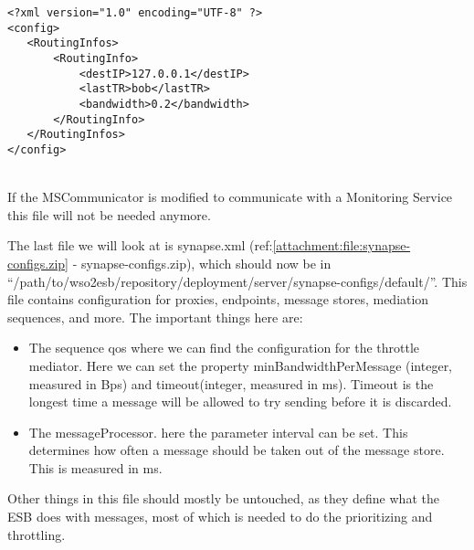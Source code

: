 \lstset{language=XML}
\begin{lstlisting}[frame=single] %It is ok that this is not referenced in text =)
<?xml version="1.0" encoding="UTF-8" ?>
<config>
   <RoutingInfos>
	   <RoutingInfo>
	       <destIP>127.0.0.1</destIP>
	       <lastTR>bob</lastTR>
	       <bandwidth>0.2</bandwidth>
	   </RoutingInfo>
   </RoutingInfos>
</config>
\end{lstlisting}\\

	If the MSCommunicator is modified to communicate with a Monitoring Service this file will not be needed anymore.

	The last file we will look at is synapse.xml (ref:\ref{attachment:file:synapse-configs.zip} - synapse-configs.zip), which should now be in “/path/to/wso2esb/repository/deployment/server/synapse-configs/default/”. This file contains configuration for proxies, endpoints, message stores, mediation sequences, and more. The important things here are:
	\begin{itemize}
	\item The sequence qos where we can find the configuration for the throttle mediator. Here we can set the property minBandwidthPerMessage (integer, measured in Bps) and timeout(integer, measured in ms). Timeout is the longest time a message will be allowed to try sending before it is discarded.
	\item The messageProcessor. here the parameter interval can be set. This determines how often a message should be taken out of the message store. This is measured in ms.
	\end{itemize}
	Other things in this file should mostly be untouched, as they define what the ESB does with messages, most of which is needed to do the prioritizing and throttling.

